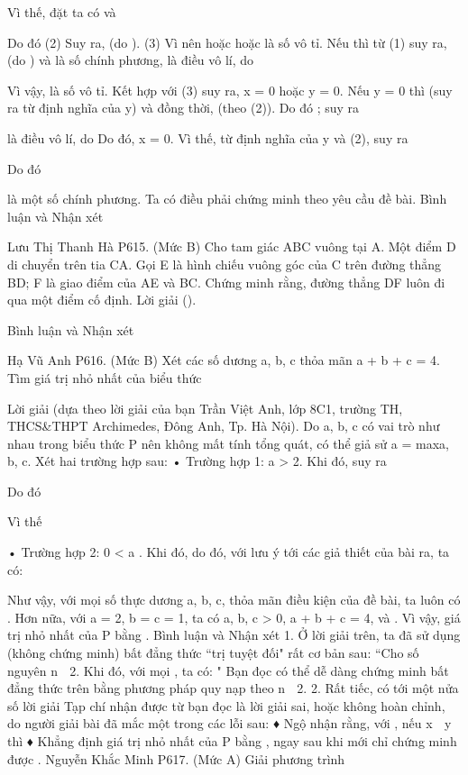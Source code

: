 \begin{multicols}{2}
	Vì thế, đặt   ta có   và
	
	Do đó
	(2)
	Suy ra,   (do  ).                                                                                                   (3)
	Vì   nên hoặc   hoặc   là số vô tỉ.
	Nếu   thì từ (1) suy ra,   (do  ) và   là số chính phương, là điều vô lí, do
	
	Vì vậy,   là số vô tỉ. Kết hợp với (3) suy ra, x = 0 hoặc y = 0.
	Nếu y = 0 thì   (suy ra từ định nghĩa của y) và đồng thời,   (theo (2)). Do đó
	;
	suy ra
	
	là điều vô lí, do  
	Do đó, x = 0. Vì thế, từ định nghĩa của y và (2), suy ra
	
	Do đó
	
	là một số chính phương.
	Ta có điều phải chứng minh theo yêu cầu đề bài.
	Bình luận và Nhận xét
	
	Lưu Thị Thanh Hà
	P615. (Mức B) Cho tam giác ABC vuông tại A. Một điểm D di chuyển trên tia CA. Gọi E là hình chiếu vuông góc của C trên đường thẳng BD; F là giao điểm của AE và BC. Chứng minh rằng, đường thẳng DF luôn đi qua một điểm cố định.
	Lời giải ().
	
	Bình luận và Nhận xét
	
	Hạ Vũ Anh
	P616. (Mức B) Xét các số dương a, b, c thỏa mãn a + b + c = 4. Tìm giá trị nhỏ nhất của biểu thức
	
	Lời giải (dựa theo lời giải của bạn Trần Việt Anh, lớp 8C1, trường TH, THCS&THPT Archimedes, Đông Anh, Tp. Hà Nội).
	Do a, b, c có vai trò như nhau trong biểu thức P nên không mất tính tổng quát, có thể giả sử a = max{a, b, c}.
	Xét hai trường hợp sau:
	• Trường hợp 1: a > 2.
	Khi đó,   suy ra
	
	Do đó
	
	Vì thế
	
	• Trường hợp 2: 0 < a .
	Khi đó,   do đó, với lưu ý tới các giả thiết của bài ra, ta có:
	
	Như vậy, với mọi số thực dương a, b, c, thỏa mãn điều kiện của đề bài, ta luôn có  .
	Hơn nữa, với a = 2, b = c = 1, ta có a, b, c > 0, a + b + c = 4, và  .
	Vì vậy, giá trị nhỏ nhất của P bằng  .
	Bình luận và Nhận xét
	1. Ở lời giải trên, ta đã sử dụng (không chứng minh) bất đẳng thức ``trị tuyệt đối" rất cơ bản sau:
	``Cho số nguyên n  2. Khi đó, với mọi  , ta có:
	"
	Bạn đọc có thể dễ dàng chứng minh bất đẳng thức trên bằng phương pháp quy nạp theo n  2.
	2. Rất tiếc, có tới một nửa số lời giải Tạp chí nhận được từ bạn đọc là lời giải sai, hoặc không hoàn chỉnh, do người giải bài đã mắc một trong các lỗi sau:
	♦ Ngộ nhận rằng, với  , nếu x  y thì  
	♦ Khẳng định giá trị nhỏ nhất của P bằng  , ngay sau khi mới chỉ chứng minh được  .
	Nguyễn Khắc Minh
	P617. (Mức A) Giải phương trình
	

\end{multicols}
